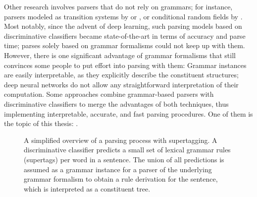 \documentclass[../document.tex]{subfiles}
\begin{document}
    Other research involves parsers that do not rely on grammars; for instance, parsers modeled as transition systems by \citet{Verseley14} or \citet{CoaCoh19}, or conditional random fields by \citet{Petrov08}.
    Most notably, since the advent of deep learning, such parsing models based on discriminative classifiers became state-of-the-art in terms of accuracy and parse time; parses solely based on grammar formalisms could not keep up with them.
    However, there is one significant advantage of grammar formalisms that still convinces some people to put effort into parsing with them:
        Grammar instances are easily interpretable, as they explicitly describe the constituent structures; deep neural networks do not allow any straightforward interpretation of their computation.
    Some approaches combine grammar-based parsers with discriminative classifiers to merge the advantages of both techniques, thus implementing interpretable, accurate, and fast parsing procedures.
    One of them is the topic of this thesis: .

    \begin{figure}
        \resizebox{\linewidth}{!}{}
        \caption{\label{fig:supertagging}
            A simplified overview of a parsing process with supertagging.
            A discriminative classifier predicts a small set of lexical grammar rules (supertags) per word in a sentence.
            The union of all predictions is assumed as a grammar instance for a parser of the underlying grammar formalism to obtain a rule derivation for the sentence, which is interpreted as a constituent tree.
        }
    \end{figure}
\end{document}
